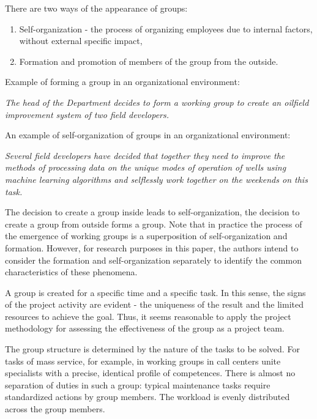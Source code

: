 \documentclass[12pt]{report}
\theoremstyle{definition}
\begin{document}
There are two ways  of the appearance of groups:
\begin{enumerate}
	\item Self-organization - the process of organizing employees due to internal factors, without external specific impact, 
	\item Formation and promotion of members of the group from the outside.
\end{enumerate}

Example of forming a group in an organizational environment: 

\textit{The head of the Department decides to form a working group to create an oilfield improvement system of two field developers. }

An example of self-organization of groups in an organizational environment: 

\textit{Several field developers have decided that together they need to improve the methods of processing data on the unique modes of operation of wells using machine learning algorithms and selflessly work together on the weekends on this task.
}\label{exp:2}

The decision to create a group inside leads to self-organization, the decision to create a group from outside forms a group.
Note that in practice the process of the emergence of working groups is a superposition of self-organization and formation.
However, for research purposes in this paper, the authors intend to consider the formation and self-organization separately to identify the common characteristics of these phenomena.

A group is created for a specific time and a specific task.
In this sense, the signs of the project activity are evident - the uniqueness of the result and the limited resources to achieve the goal.
Thus, it seems reasonable to apply the project methodology for assessing the effectiveness of the group as a project team.

The group structure is determined by the nature of the tasks to be solved.
For tasks of mass service, for example, in working groups in call centers unite specialists with a precise, identical profile of competences.
There is almost no separation of duties in such a group: typical maintenance tasks require standardized actions by group members.
The workload is evenly distributed across the group members.
\end{document}
